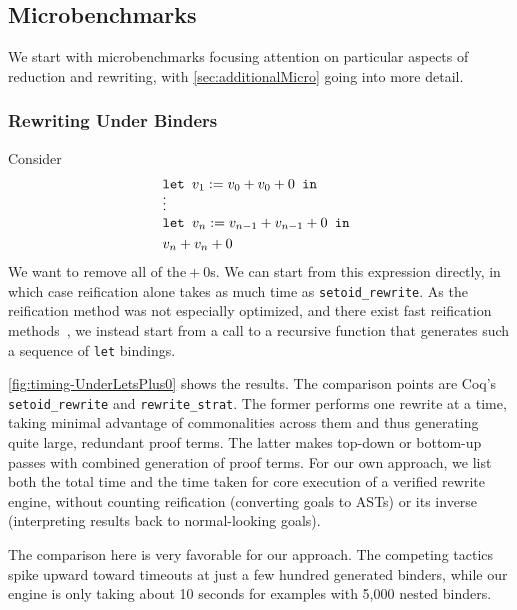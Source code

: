 \subsection{Microbenchmarks} \label{sec:micro}

We start with microbenchmarks focusing attention on particular aspects of reduction and rewriting, with \autoref{sec:additionalMicro} going into more detail.

\subsubsection{Rewriting Under Binders} \label{sec:micro:UnderLetsPlus0} \label{sec:micro:Plus0Tree}

Consider
\vspace{-1.5em} {\small \begin{align*}
  & \letin[{v_1 := v_0 + v_0 + 0}{}] \\ \noalign{\vskip-7pt}
  & \vdots \\ \noalign{\vskip-3pt}
  & \letin[{v_n := v_{n-1} + v_{n-1} + 0}{}] \\
  & v_n + v_n + 0
\end{align*}}%
We want to remove all of the${}+0$s.
We can start from this expression directly, in which case reification alone takes as much time as \texttt{setoid\_rewrite}.
As the reification method was not especially optimized, and there exist fast reification methods~\cite{reification-by-parametricity}, we instead start from a call to a recursive function that generates such a sequence of \texttt{let} bindings.

\autoref{fig:timing-UnderLetsPlus0} shows the results.
The comparison points are Coq's \texttt{setoid\_rewrite} and \texttt{rewrite\_strat}.
The former performs one rewrite at a time, taking minimal advantage of commonalities across them and thus generating quite large, redundant proof terms.
The latter makes top-down or bottom-up passes with combined generation of proof terms.
For our own approach, we list both the total time and the time taken for core execution of a verified rewrite engine, without counting reification (converting goals to ASTs) or its inverse (interpreting results back to normal-looking goals).

The comparison here is very favorable for our approach.
The competing tactics spike upward toward timeouts at just a few hundred generated binders, while our engine is only taking about 10 seconds for examples with 5,000 nested binders.

